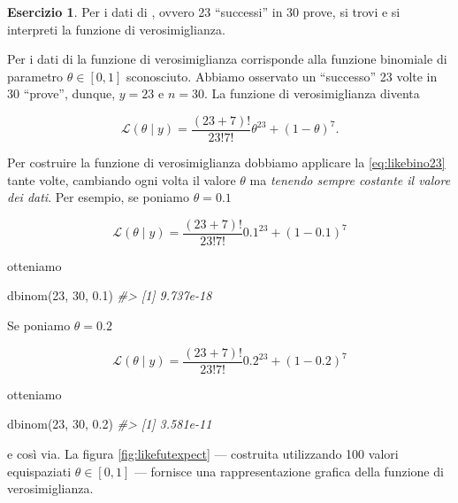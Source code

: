 \documentclass[
  11pt,
]{krantz}
\makeatletter
\newenvironment{Shaded}{\begin{snugshade}}{\end{snugshade}}
\newcommand{\CommentTok}[1]{\textcolor[rgb]{0.37,0.37,0.37}{\textit{#1}}}
\newcommand{\DecValTok}[1]{\textcolor[rgb]{0.06,0.06,0.06}{#1}}
\newcommand{\FloatTok}[1]{\textcolor[rgb]{0.06,0.06,0.06}{#1}}
\newcommand{\FunctionTok}[1]{\textcolor[rgb]{0,0,0}{#1}}
\newcommand{\NormalTok}[1]{#1}
\newenvironment{kframe}{%
\medskip{}
\setlength{\fboxsep}{.8em}
 \def\at@end@of@kframe{}%
 \ifinner\ifhmode%
  \def\at@end@of@kframe{\end{minipage}}%
  \begin{minipage}{\columnwidth}%
 \fi\fi%
 \def\FrameCommand##1{\hskip\@totalleftmargin \hskip-\fboxsep
 \colorbox{shadecolor}{##1}\hskip-\fboxsep
     \hskip-\linewidth \hskip-\@totalleftmargin \hskip\columnwidth}%
 \MakeFramed {\advance\hsize-\width
   \@totalleftmargin\z@ \linewidth\hsize
   \@setminipage}}%
 {\par\unskip\endMakeFramed%
 \at@end@of@kframe}
\renewenvironment{Shaded}{\begin{kframe}}{\end{kframe}}
\theoremstyle{definition}
\theoremstyle{definition}
\theoremstyle{definition}
\newtheorem{exercise}{Esercizio}[chapter]
\theoremstyle{definition}
\theoremstyle{remark}
\makeatother
\begin{document}
\begin{exercise}
Per i dati di \citet{zetschefuture2019}, ovvero 23 ``successi'' in 30 prove, si trovi e si interpreti la funzione di verosimiglianza.
\end{exercise}

Per i dati di \citet{zetschefuture2019} la funzione di verosimiglianza corrisponde alla funzione binomiale di parametro \(\theta \in [0, 1]\) sconosciuto. Abbiamo osservato un ``successo'' 23 volte in 30 ``prove'', dunque, \(y = 23\) e \(n = 30\). La funzione di verosimiglianza diventa

\begin{equation}
\mathcal{L}(\theta \mid y) = \frac{(23 + 7)!}{23!7!} \theta^{23} + (1-\theta)^7.
\label{eq:likebino23}
\end{equation}

Per costruire la funzione di verosimiglianza dobbiamo applicare la \eqref{eq:likebino23} tante volte, cambiando ogni volta il valore \(\theta\) ma \emph{tenendo sempre costante il valore dei dati}. Per esempio, se poniamo \(\theta = 0.1\)

\[
\mathcal{L}(\theta \mid y) = \frac{(23 + 7)!}{23!7!} 0.1^{23} + (1-0.1)^7
\]

otteniamo

\begin{Shaded}
\begin{Highlighting}[]
\FunctionTok{dbinom}\NormalTok{(}\DecValTok{23}\NormalTok{, }\DecValTok{30}\NormalTok{, }\FloatTok{0.1}\NormalTok{)}
\CommentTok{\#\textgreater{} [1] 9.737e{-}18}
\end{Highlighting}
\end{Shaded}

Se poniamo \(\theta = 0.2\)

\[
\mathcal{L}(\theta \mid y) = \frac{(23 + 7)!}{23!7!} 0.2^{23} + (1-0.2)^7
\]

otteniamo

\begin{Shaded}
\begin{Highlighting}[]
\FunctionTok{dbinom}\NormalTok{(}\DecValTok{23}\NormalTok{, }\DecValTok{30}\NormalTok{, }\FloatTok{0.2}\NormalTok{)}
\CommentTok{\#\textgreater{} [1] 3.581e{-}11}
\end{Highlighting}
\end{Shaded}

e così via. La figura \ref{fig:likefutexpect} --- costruita utilizzando 100 valori equispaziati \(\theta \in [0, 1]\) --- fornisce una rappresentazione grafica della funzione di verosimiglianza.
\end{document}

